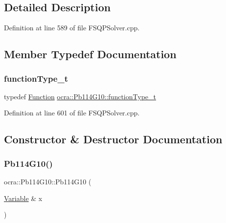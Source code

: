 \subsection{Detailed Description}


Definition at line 589 of file F\+S\+Q\+P\+Solver.\+cpp.



\subsection{Member Typedef Documentation}
\hypertarget{classocra_1_1Pb114G10_abefa27aa6362ee95d59c39654bd7ab2f}{}\label{classocra_1_1Pb114G10_abefa27aa6362ee95d59c39654bd7ab2f} 
\subsubsection{\texorpdfstring{function\+Type\+\_\+t}{functionType\_t}}
{\footnotesize\ttfamily typedef \hyperlink{classocra_1_1Function}{Function} \hyperlink{classocra_1_1Pb114G10_abefa27aa6362ee95d59c39654bd7ab2f}{ocra\+::\+Pb114\+G10\+::function\+Type\+\_\+t}}



Definition at line 601 of file F\+S\+Q\+P\+Solver.\+cpp.



\subsection{Constructor \& Destructor Documentation}
\hypertarget{classocra_1_1Pb114G10_a3a99a728ba252d05dd70b24d39dfb643}{}\label{classocra_1_1Pb114G10_a3a99a728ba252d05dd70b24d39dfb643} 
\subsubsection{\texorpdfstring{Pb114\+G10()}{Pb114G10()}}
{\footnotesize\ttfamily ocra\+::\+Pb114\+G10\+::\+Pb114\+G10 (\begin{DoxyParamCaption}\item[{\hyperlink{classocra_1_1Variable}{Variable} \&}]{x }\end{DoxyParamCaption})\hspace{0.3cm}{\ttfamily [inline]}}



